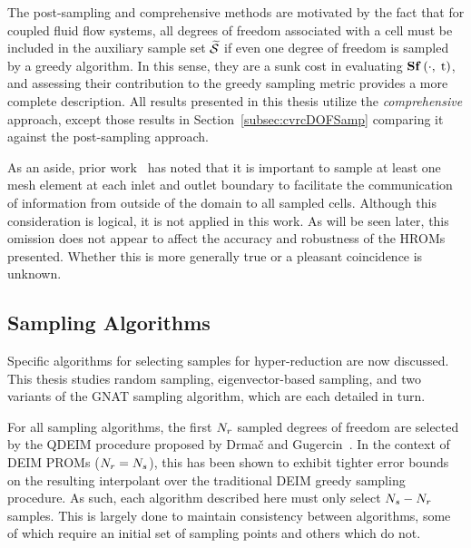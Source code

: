 The post-sampling and comprehensive methods are motivated by the fact that for coupled fluid flow systems, all degrees of freedom associated with a cell must be included in the auxiliary sample set $\mathcal{\widetilde{S}}$ if even one degree of freedom is sampled by a greedy algorithm. In this sense, they are a sunk cost in evaluating $\mathbf{S} \mathbf{f} \left(\cdot, \; \text{t}\right)$, and assessing their contribution to the greedy sampling metric provides a more complete description. All results presented in this thesis utilize the \textit{comprehensive} approach, except those results in Section~\ref{subsec:cvrcDOFSamp} comparing it against the post-sampling approach.

As an aside, prior work~\cite{Carlberg2013} has noted that it is important to sample at least one mesh element at each inlet and outlet boundary to facilitate the communication of information from outside of the domain to all sampled cells. Although this consideration is logical, it is not applied in this work. As will be seen later, this omission does not appear to affect the accuracy and robustness of the HROMs presented. Whether this is more generally true or a pleasant coincidence is unknown.

\subsection{Sampling Algorithms}\label{subsec:sampAlgos}
%
Specific algorithms for selecting samples for hyper-reduction are now discussed. This thesis studies random sampling, eigenvector-based sampling, and two variants of the GNAT sampling algorithm, which are each detailed in turn.

For all sampling algorithms, the first $N_r$ sampled degrees of freedom are selected by the QDEIM procedure proposed by Drma\v{c} and Gugercin~\cite{Drmac2016}. In the context of DEIM PROMs ($N_r = N_s$), this has been shown to exhibit tighter error bounds on the resulting interpolant over the traditional DEIM greedy sampling procedure. As such, each algorithm described here must only select $N_s - N_r$ samples. This is largely done to maintain consistency between algorithms, some of which require an initial set of sampling points and others which do not.

